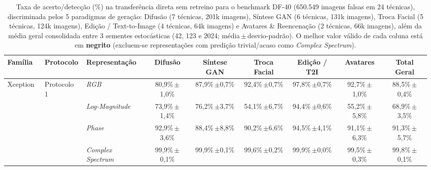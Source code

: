 \providecommand{\pmsd}[2]{#1\,{\scriptsize$\pm$#2}}

\begin{table}[!t]
\centering
\caption{Taxa de acerto/detecção (\%) na transferência direta sem retreino para o benchmark DF-40 (650.549 imagens falsas em 24 técnicas), discriminada pelos 5 paradigmas de geração: Difusão (7 técnicas, 201k imagens), Síntese GAN (6 técnicas, 131k imagens), Troca Facial (5 técnicas, 124k imagens), Edição / Text-to-Image (4 técnicas, 64k imagens) e Avatares \& Reencenação (2 técnicas, 66k imagens), além da média geral consolidada entre 3 sementes estocásticas (42, 123 e 2024; média\,$\pm$\,desvio-padrão).
O melhor valor válido de cada coluna está em \textbf{negrito} (excluem-se representações com predição trivial/acaso como \textit{Complex Spectrum}).}
\label{tab:df40_paradigmas}
\vspace{-2mm}
\scriptsize\renewcommand{\arraystretch}{0.88}
\setlength{\tabcolsep}{3.5pt}
\begin{tabular}{@{}lll ccccc c@{}}
\toprule
Família & Protocolo & Representação & Difusão & Síntese GAN & Troca Facial & Edição / T2I & Avatares & Total Geral \\
\midrule
Xception~\cite{chollet2017xception} & Protocolo 1  & \textit{RGB}                     & \pmsd{80,9\%}{1,0\%} & \pmsd{87,9\%}{0,7\%} & \pmsd{92,4\%}{0,7\%} & \pmsd{97,8\%}{0,7\%} & \pmsd{92,7\%}{1,0\%} & \pmsd{88,5\%}{0,4\%} \\
                                    &              & \textit{Log-Magnitude}           & \pmsd{73,9\%}{1,4\%} & \pmsd{76,2\%}{3,7\%} & \pmsd{54,1\%}{6,7\%} & \pmsd{94,4\%}{0,6\%} & \pmsd{55,2\%}{5,8\%} & \pmsd{68,9\%}{3,5\%} \\
                                    &              & \textit{Phase}                   & \pmsd{92,9\%}{3,6\%} & \pmsd{88,4\%}{8,8\%} & \pmsd{90,2\%}{6,6\%} & \pmsd{94,5\%}{4,1\%} & \pmsd{91,1\%}{6,3\%} & \pmsd{91,3\%}{5,7\%} \\
                                    &              & \textit{Complex Spectrum}        & \pmsd{99,9\%}{0,1\%} & \pmsd{99,9\%}{0,1\%} & \pmsd{99,6\%}{0,2\%} & \pmsd{99,9\%}{0,0\%} & \pmsd{99,5\%}{0,3\%} & \pmsd{99,8\%}{0,1\%} \\

\end{tabular}
\end{table}
